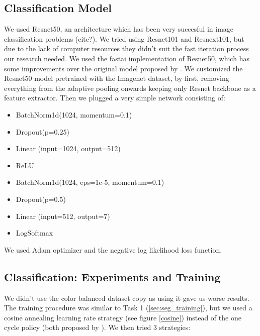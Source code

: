 \documentclass[conference]{IEEEtran}
\begin{document}
\subsection{Classification Model}
We used Resnet50, an architecture which has been very succesful in image classification problems (cite?). We tried using Resnet101 and Resnext101, but due to the lack of computer resources they didn't suit the fast iteration process our research needed. We used the fastai implementation of Resnet50, which has some improvements over the original model proposed by \cite{resnet}. We customized the Resnet50 model pretrained with the Imagenet dataset, by first, removing everything from the adaptive pooling onwards keeping only Resnet backbone as a feature extractor. Then we plugged a very simple network consisting of:
\begin{itemize}
\item BatchNorm1d(1024, momentum=0.1)
\item Dropout(p=0.25)
\item Linear (input=1024, output=512)
\item ReLU 
\item BatchNorm1d(1024, eps=1e-5, momentum=0.1)
\item Dropout(p=0.5)
\item Linear (input=512, output=7)
\item LogSoftmax
\end{itemize}
We used Adam optimizer and the negative log likelihood loss function.

\subsection{Classification: Experiments and Training}



We didn't use the color balanced dataset copy as using it gave us worse results. The training procedure was similar to Task 1 (\ref{sec:seg_training}), but we used a cosine annealing learning rate strategy (see figure \ref{cosine}) instead of the one cycle policy (both proposed by \cite{leslie}). We then tried 3 strategies:
\end{document}
